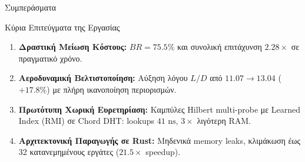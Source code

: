 \begin{frame}{Συμπεράσματα}
  \begin{block}{Κύρια Επιτεύγματα της Εργασίας}
    \begin{enumerate}
      \item \textbf{Δραστική Μείωση Κόστους:} $BR = 75.5\%$ και συνολική επιτάχυνση \textbf{$2.28\times$} σε πραγματικό χρόνο.
      \item \textbf{Αεροδυναμική Βελτιστοποίηση:} Αύξηση λόγου $L/D$ από $11.07 \to \mathbf{13.04}$ (\textbf{$+17.8\%$}) με πλήρη ικανοποίηση περιορισμών.
      \item \textbf{Πρωτότυπη Χωρική Ευρετηρίαση:} Καμπύλες Hilbert multi-probe με Learned Index (RMI) σε Chord DHT: lookups $41\text{ ns}$, $3\times$ λιγότερη RAM.
      \item \textbf{Αρχιτεκτονική Παραγωγής σε Rust:} Μηδενικά memory leaks, κλιμάκωση έως 32 κατανεμημένους εργάτες ($21.5\times$ speedup).
    \end{enumerate}
  \end{block}
\end{frame}
